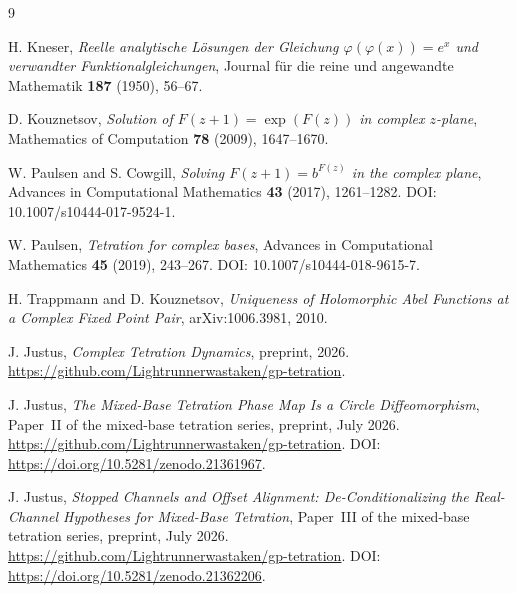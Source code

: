 \documentclass[11pt,a4paper]{article}
\theoremstyle{plain}
\theoremstyle{definition}
\theoremstyle{remark}
\begin{document}
\begin{thebibliography}{9}

H. Kneser, \emph{Reelle analytische L\"osungen der Gleichung $\varphi(\varphi(x))=e^x$ und verwandter Funktionalgleichungen}, Journal f\"ur die reine und angewandte Mathematik \textbf{187} (1950), 56--67.

D. Kouznetsov, \emph{Solution of $F(z+1)=\exp(F(z))$ in complex $z$-plane}, Mathematics of Computation \textbf{78} (2009), 1647--1670.

W. Paulsen and S. Cowgill, \emph{Solving $F(z+1)=b^{F(z)}$ in the complex plane}, Advances in Computational Mathematics \textbf{43} (2017), 1261--1282. DOI: 10.1007/s10444-017-9524-1.

W. Paulsen, \emph{Tetration for complex bases}, Advances in Computational Mathematics \textbf{45} (2019), 243--267. DOI: 10.1007/s10444-018-9615-7.

H. Trappmann and D. Kouznetsov, \emph{Uniqueness of Holomorphic Abel Functions at a Complex Fixed Point Pair}, arXiv:1006.3981, 2010.

J. Justus, \emph{Complex Tetration Dynamics}, preprint, 2026. \url{https://github.com/Lightrunnerwastaken/gp-tetration}.

J. Justus, \emph{The Mixed-Base Tetration Phase Map Is a Circle Diffeomorphism}, Paper~II of the mixed-base tetration series, preprint, July 2026. \url{https://github.com/Lightrunnerwastaken/gp-tetration}. DOI: \url{https://doi.org/10.5281/zenodo.21361967}.

J. Justus, \emph{Stopped Channels and Offset Alignment: De-Conditionalizing the Real-Channel Hypotheses for Mixed-Base Tetration}, Paper~III of the mixed-base tetration series, preprint, July 2026. \url{https://github.com/Lightrunnerwastaken/gp-tetration}. DOI: \url{https://doi.org/10.5281/zenodo.21362206}.

\end{thebibliography}
\end{document}
